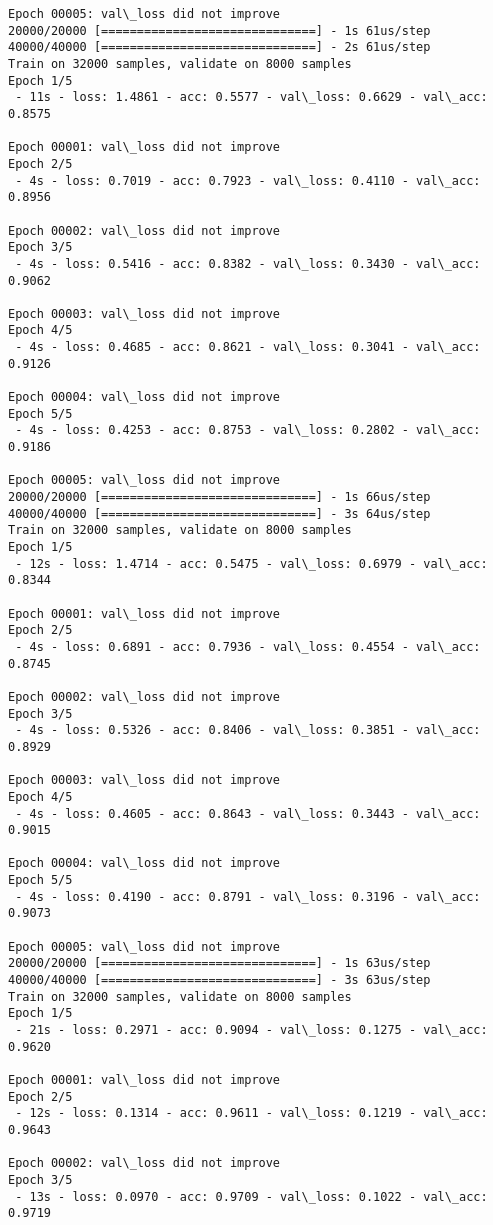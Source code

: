 \documentclass[11pt]{article}
\begin{document}
\begin{Verbatim}[commandchars=\\\{\}]
Epoch 00005: val\_loss did not improve
20000/20000 [==============================] - 1s 61us/step
40000/40000 [==============================] - 2s 61us/step
Train on 32000 samples, validate on 8000 samples
Epoch 1/5
 - 11s - loss: 1.4861 - acc: 0.5577 - val\_loss: 0.6629 - val\_acc: 0.8575

Epoch 00001: val\_loss did not improve
Epoch 2/5
 - 4s - loss: 0.7019 - acc: 0.7923 - val\_loss: 0.4110 - val\_acc: 0.8956

Epoch 00002: val\_loss did not improve
Epoch 3/5
 - 4s - loss: 0.5416 - acc: 0.8382 - val\_loss: 0.3430 - val\_acc: 0.9062

Epoch 00003: val\_loss did not improve
Epoch 4/5
 - 4s - loss: 0.4685 - acc: 0.8621 - val\_loss: 0.3041 - val\_acc: 0.9126

Epoch 00004: val\_loss did not improve
Epoch 5/5
 - 4s - loss: 0.4253 - acc: 0.8753 - val\_loss: 0.2802 - val\_acc: 0.9186

Epoch 00005: val\_loss did not improve
20000/20000 [==============================] - 1s 66us/step
40000/40000 [==============================] - 3s 64us/step
Train on 32000 samples, validate on 8000 samples
Epoch 1/5
 - 12s - loss: 1.4714 - acc: 0.5475 - val\_loss: 0.6979 - val\_acc: 0.8344

Epoch 00001: val\_loss did not improve
Epoch 2/5
 - 4s - loss: 0.6891 - acc: 0.7936 - val\_loss: 0.4554 - val\_acc: 0.8745

Epoch 00002: val\_loss did not improve
Epoch 3/5
 - 4s - loss: 0.5326 - acc: 0.8406 - val\_loss: 0.3851 - val\_acc: 0.8929

Epoch 00003: val\_loss did not improve
Epoch 4/5
 - 4s - loss: 0.4605 - acc: 0.8643 - val\_loss: 0.3443 - val\_acc: 0.9015

Epoch 00004: val\_loss did not improve
Epoch 5/5
 - 4s - loss: 0.4190 - acc: 0.8791 - val\_loss: 0.3196 - val\_acc: 0.9073

Epoch 00005: val\_loss did not improve
20000/20000 [==============================] - 1s 63us/step
40000/40000 [==============================] - 3s 63us/step
Train on 32000 samples, validate on 8000 samples
Epoch 1/5
 - 21s - loss: 0.2971 - acc: 0.9094 - val\_loss: 0.1275 - val\_acc: 0.9620

Epoch 00001: val\_loss did not improve
Epoch 2/5
 - 12s - loss: 0.1314 - acc: 0.9611 - val\_loss: 0.1219 - val\_acc: 0.9643

Epoch 00002: val\_loss did not improve
Epoch 3/5
 - 13s - loss: 0.0970 - acc: 0.9709 - val\_loss: 0.1022 - val\_acc: 0.9719


\end{Verbatim}
\end{document}
